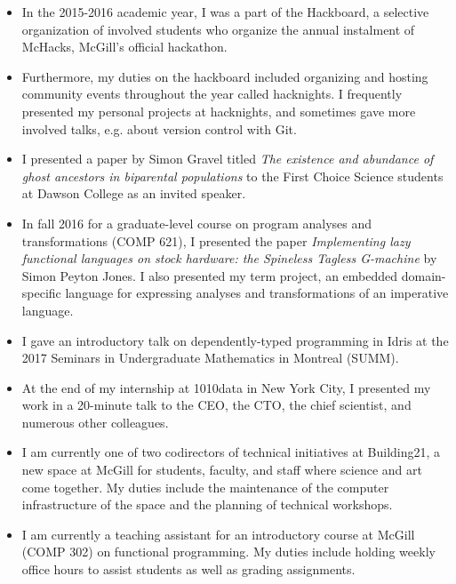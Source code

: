 \documentclass[11pt,letterpaper]{article}
\begin{document}
\begin{itemize}
  \item
    In the 2015-2016 academic year, I was a part of the Hackboard, a selective
    organization of involved students who organize the annual instalment of
    McHacks, McGill's official hackathon.

  \item
    Furthermore, my duties on the hackboard included organizing and hosting
    community events throughout the year called hacknights. I frequently
    presented my personal projects at hacknights, and sometimes gave more
    involved talks, e.g. about version control with Git.

  \item
    I presented a paper by Simon Gravel titled \textit{The existence and
    abundance of ghost ancestors in biparental populations} to the First Choice
    Science students at Dawson College as an invited speaker.

  \item
    In fall 2016 for a graduate-level course on program analyses and
    transformations (COMP 621), I presented the paper \textit{Implementing lazy
    functional languages on stock hardware: the Spineless Tagless G-machine} by
    Simon Peyton Jones. I also presented my term project, an embedded
    domain-specific language for expressing analyses and transformations of an
    imperative language.

  \item
    I gave an introductory talk on dependently-typed programming in Idris at
    the 2017 Seminars in Undergraduate Mathematics in Montreal (SUMM).

  \item
    At the end of my internship at 1010data in New York City, I presented my
    work in a 20-minute talk to the CEO, the CTO, the chief scientist, and
    numerous other colleagues.

  \item
    I am currently one of two codirectors of technical initiatives at
    Building21, a new space at McGill for students, faculty, and staff where
    science and art come together. My duties include the maintenance of the
    computer infrastructure of the space and the planning of technical
    workshops.

  \item
    I am currently a teaching assistant for an introductory course at McGill
    (COMP 302) on functional programming. My duties include holding weekly
    office hours to assist students as well as grading assignments.
\end{itemize}
\end{document}
